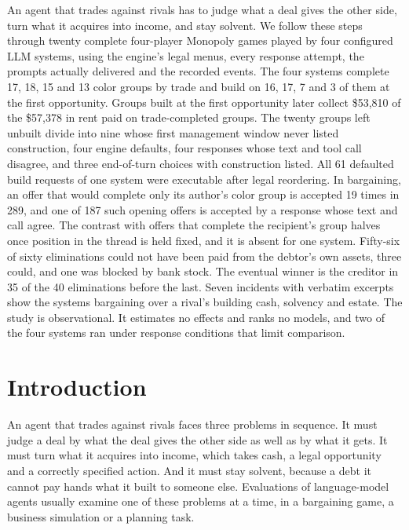 \medskip
\noindent An agent that trades against rivals has to judge what a deal gives the other side, turn what it acquires into income, and stay solvent. We follow these steps through twenty complete four-player Monopoly games played by four configured LLM systems, using the engine's legal menus, every response attempt, the prompts actually delivered and the recorded events. The four systems complete 17, 18, 15 and 13 color groups by trade and build on 16, 17, 7 and 3 of them at the first opportunity. Groups built at the first opportunity later collect \$53,810 of the \$57,378 in rent paid on trade-completed groups. The twenty groups left unbuilt divide into nine whose first management window never listed construction, four engine defaults, four responses whose text and tool call disagree, and three end-of-turn choices with construction listed. All 61 defaulted build requests of one system were executable after legal reordering. In bargaining, an offer that would complete only its author's color group is accepted 19 times in 289, and one of 187 such opening offers is accepted by a response whose text and call agree. The contrast with offers that complete the recipient's group halves once position in the thread is held fixed, and it is absent for one system. Fifty-six of sixty eliminations could not have been paid from the debtor's own assets, three could, and one was blocked by bank stock. The eventual winner is the creditor in 35 of the 40 eliminations before the last. Seven incidents with verbatim excerpts show the systems bargaining over a rival's building cash, solvency and estate. The study is observational. It estimates no effects and ranks no models, and two of the four systems ran under response conditions that limit comparison.

\section{Introduction}
\label{sec:intro}

An agent that trades against rivals faces three problems in sequence. It must judge a deal by what the deal gives the other side as well as by what it gets. It must turn what it acquires into income, which takes cash, a legal opportunity and a correctly specified action. And it must stay solvent, because a debt it cannot pay hands what it built to someone else. Evaluations of language-model agents usually examine one of these problems at a time, in a bargaining game, a business simulation or a planning task.

